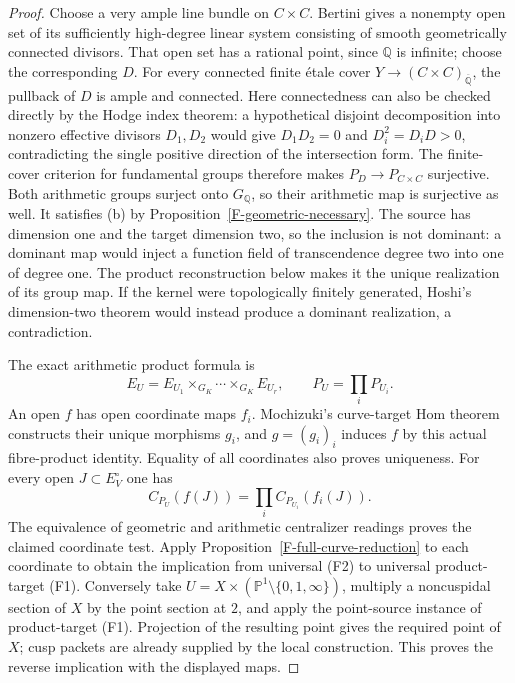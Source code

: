 \documentclass[11pt,oneside]{article}
\begin{document}
\begin{proof}
Choose a very ample line bundle on $C\times C$. Bertini gives
a nonempty open set of its sufficiently high-degree linear
system consisting of smooth geometrically connected divisors.
That open set has a rational point, since $\mathbb Q$ is
infinite; choose the corresponding $D$. For every connected
finite \'etale cover $Y\to(C\times C)_{\overline{\mathbb Q}}$,
the pullback of $D$ is ample and connected. Here connectedness
can also be checked directly by the Hodge index theorem:
a hypothetical disjoint decomposition into nonzero effective
divisors $D_1,D_2$ would give
$D_1D_2=0$ and $D_i^2=D_iD>0$, contradicting the single
positive direction of the intersection form. The finite-cover
criterion for fundamental groups therefore makes
$P_D\to P_{C\times C}$ surjective. Both arithmetic groups
surject onto $G_{\mathbb Q}$, so their arithmetic map is
surjective as well. It satisfies (b) by
Proposition~\ref{F-geometric-necessary}. The source has
dimension one and the target dimension two, so the inclusion
is not dominant: a dominant map would inject a function field
of transcendence degree two into one of degree one.
The product reconstruction below makes it the unique
realization of its group map. If the kernel were topologically
finitely generated, Hoshi's dimension-two theorem would instead
produce a dominant realization, a contradiction.

The exact arithmetic product formula is
\[
 E_U=E_{U_1}\times_{G_K}\cdots\times_{G_K}E_{U_r},
 \qquad P_U=\prod_iP_{U_i}.
\]
An open $f$ has open coordinate maps $f_i$. Mochizuki's
curve-target Hom theorem constructs their unique morphisms
$g_i$, and $g=(g_i)_i$ induces $f$ by this actual fibre-product
identity. Equality of all coordinates also proves uniqueness.
For every open $J\subset E_V^\circ$ one has
\[
 C_{P_U}(f(J))=\prod_i C_{P_{U_i}}(f_i(J)).
\]
The equivalence of geometric and arithmetic centralizer
readings proves the claimed coordinate test. Apply
Proposition~\ref{F-full-curve-reduction} to each coordinate
to obtain the implication from universal (F2) to universal
product-target (F1). Conversely take $U=X\times
(\mathbb P^1\setminus\{0,1,\infty\})$, multiply a noncuspidal
section of $X$ by the point section at $2$, and apply the
point-source instance of product-target (F1). Projection of
the resulting point gives the required point of $X$; cusp
packets are already supplied by the local construction.
This proves the reverse implication with the displayed maps.
\end{proof}
\end{document}
